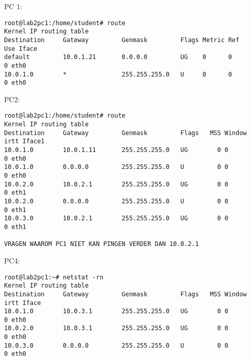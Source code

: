 \newpage
PC 1:
\begin{lstlisting}
root@lab2pc1:/home/student# route
Kernel IP routing table
Destination     Gateway         Genmask         Flags Metric Ref    Use Iface
default         10.0.1.21       0.0.0.0         UG    0      0        0 eth0
10.0.1.0        *               255.255.255.0   U     0      0        0 eth0
\end{lstlisting}

PC2:
\begin{lstlisting}
root@lab2pc1:/home/student# route
Kernel IP routing table
Destination     Gateway         Genmask         Flags   MSS Window  irtt Iface1
10.0.1.0        10.0.1.11       255.255.255.0   UG        0 0          0 eth0
10.0.1.0        0.0.0.0         255.255.255.0   U         0 0          0 eth0
10.0.2.0        10.0.2.1        255.255.255.0   UG        0 0          0 eth1
10.0.2.0        0.0.0.0         255.255.255.0   U         0 0          0 eth1
10.0.3.0        10.0.2.1        255.255.255.0   UG        0 0          0 eth1

VRAGEN WAAROM PC1 NIET KAN PINGEN VERDER DAN 10.0.2.1
\end{lstlisting}

PC4:
\begin{lstlisting}
root@lab2pc1:~# netstat -rn
Kernel IP routing table
Destination     Gateway         Genmask         Flags   MSS Window  irtt Iface
10.0.1.0        10.0.3.1        255.255.255.0   UG        0 0          0 eth0
10.0.2.0        10.0.3.1        255.255.255.0   UG        0 0          0 eth0
10.0.3.0        0.0.0.0         255.255.255.0   U         0 0          0 eth0
\end{lstlisting}

